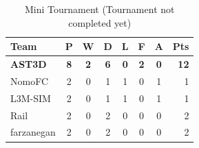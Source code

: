 \begin{table}[t!]
\caption{Mini Tournament (Tournament not completed yet)}
\label{EasyTournament}
\begin{center}
\begin{tabular}{l*{6}{c}r}
Team              	& P & W & D & L & F  & A & Pts \\ \hline
\textbf{AST3D} 		& \textbf{8} & \textbf{2} & \textbf{6} & \textbf{0} & \textbf{ 2} & \textbf{0} &  \textbf{12}  \\
NomoFC            	& 2 & 0 & 1 & 1 &  0 & 1 &  1  \\
L3M-SIM     		& 2 & 0 & 1 & 1 &  0 & 1 &  1  \\
Rail     		    & 2 & 0 & 2 & 0 &  0 & 0 &  2  \\
farzanegan     		& 2 & 0 & 2 & 0 &  0 & 0 &  2  \\
\end{tabular}
\end{center}
\end{table}






